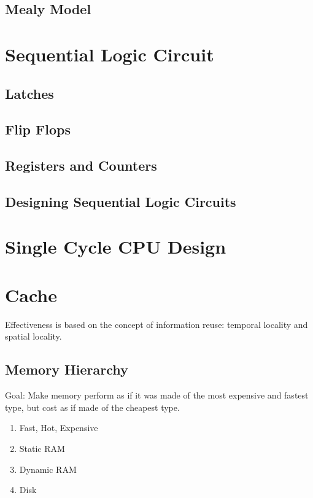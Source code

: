 \documentclass[11pt]{article}
\begin{document}
\subsection{Mealy Model}

\section{Sequential Logic Circuit}

\subsection{Latches}

\subsection{Flip Flops}

\subsection{Registers and Counters}

\subsection{Designing Sequential Logic Circuits}

\section{Single Cycle CPU Design}

\section{Cache}

Effectiveness is based on the concept of information reuse: temporal locality and spatial locality.

\subsection{Memory Hierarchy}

Goal: Make memory perform as if it was made of the most expensive and fastest type, but cost as if made of the cheapest type.

\begin{enumerate}
	\item Fast, Hot, Expensive
	\item Static RAM
	\item Dynamic RAM
	\item Disk
\end{enumerate}
\end{document}
